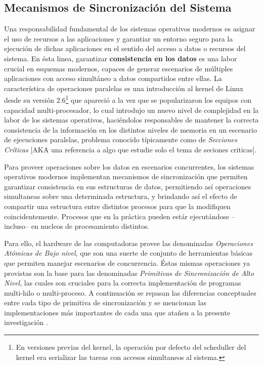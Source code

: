 \subsection{Mecanismos de Sincronización del Sistema}
Una responsabilidad fundamental de los sistemas operativos modernos es asignar el uso de recursos a las aplicaciones y garantiar un entorno seguro para la ejecución de dichas aplicaciones en el sentido del acceso a datos o recursos del sistema. En ésta linea, garantizar \textbf{consistencia en los datos} es una labor crucial en esquemas modernos, capaces de generar escenarios de múltiples aplicaciones con acceso simultáneo a datos compartidos entre ellas. La característica de operaciones paralelas es una introducción al kernel de Linux desde su versión 2.6\footnote{En versiones previas del kernel, la operación por defecto del scheduller del kernel era serializar las tareas con accesos simultaneos al sistema.} que apareció a la vez que se popularizaron los equipos con capacidad multi-procesador, lo cual introdujo un nuevo nivel de complejidad en la labor de los sistemas operativos, haciéndolos responsables de mantener la correcta consistencia de la información en los distintos niveles de memoria en un escenario de ejecuciones paralelas, problema conocido típicamente como de \emph{Secciones Críticas} [AKA una referencia a algo que estudie solo el tema de seciones criticas].

Para proveer operaciones sobre los datos en escenarios concurrentes, los sistemas operativos modernos implementan mecanismos de sincronización que permiten garantizar consistencia en sus estructuras de datos, permitiendo así operaciones simultaneas sobre una determinada estructura, y brindando así el efecto de compartir una estructura entre distintos procesos para que la modifiquen coincidentemente. Procesos que en la práctica pueden estár ejecutándose --incluso-- en nucleos de procesamiento distintos.

Para ello, el hardware de las computadoras provee las denominadas \emph{Operaciones Atómicas de Bajo nivel}, que son una suerte de conjunto de herramientas básicas que permiten manejar escenarios de concurrencia. Éstas mismas operaciones ya provistas son la base para las denominadas \emph{Primitivas de Sincronización de Alto Nivel}, las cuales son cruciales para la correcta implementación de programas multi-hilo o multi-proceso. A continuación se repasan las diferencias conceptuales entre cada tipo de primitiva de sincronización y se mencionan las implementaciones más importantes de cada una que atañen a la presente investigación \cite{book:SOConcepts}.

